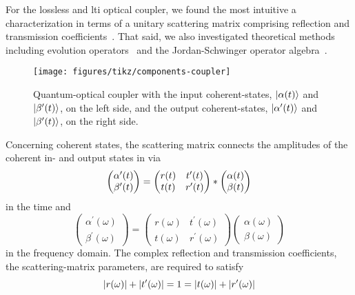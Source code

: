 For the lossless and \gls{lti} optical coupler, we found the most intuitive a characterization in terms of a unitary scattering matrix comprising reflection and transmission coefficients~\cite{Vogel2006}.
That said, we also investigated theoretical methods including evolution operators~\cite{Haroche2006} and the Jordan-Schwinger operator algebra~\cite{Leonhardt2003}.
\begin{figure}[htb]
    \centering
    \texttt{[image: figures/tikz/components-coupler]}
    \caption{Quantum-optical coupler with the input coherent-states, $\lvert\alpha(t)\rangle$ and $\lvert\beta^\prime(t)\rangle$, on the left side, and the output coherent-states, $\lvert\alpha^\prime(t)\rangle$ and $\lvert\beta^\prime(t)\rangle$, on the right side.}\label{fig:components_two_port}
\end{figure}
Concerning coherent states, the scattering matrix connects the amplitudes of the coherent in- and output states in  via
\begin{equation}
	\begin{pmatrix}
		\alpha^\prime(t)
		\\
		\beta^\prime(t)
	\end{pmatrix}
	=
	\begin{pmatrix}
		r(t) & t^\prime(t) \\
		t(t) & r^\prime(t)
	\end{pmatrix}
	\ast
	\begin{pmatrix}
		\alpha(t)
		\\
		\beta(t)
	\end{pmatrix}	
\end{equation}
in the time and
\begin{equation}
	\begin{pmatrix}
		\alpha^\prime(\omega)
		\\
		\beta^\prime(\omega)
	\end{pmatrix}
	=
	\begin{pmatrix}
		r(\omega) & t^\prime(\omega) \\
		t(\omega) & r^\prime(\omega)
	\end{pmatrix}
	\begin{pmatrix}
		\alpha(\omega)
		\\
		\beta(\omega)
	\end{pmatrix}	
\end{equation}
in the frequency domain.
The complex reflection and transmission coefficients, the scattering-matrix parameters, are required to satisfy
\begin{equation}
	\lvert r(\omega)\rvert
	+
	\lvert t^\prime(\omega)\rvert
	=
	1
	=
	\lvert t(\omega)\rvert
	+
	\lvert r^\prime(\omega)\rvert
\end{equation}
